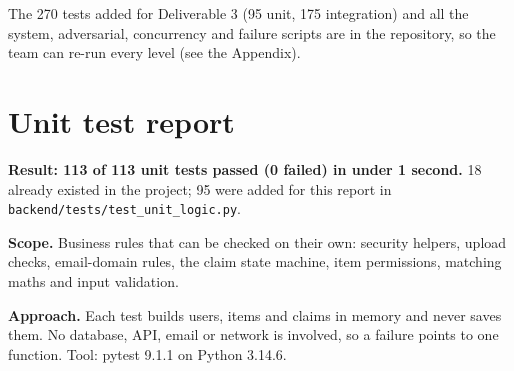 The 270 tests added for Deliverable 3 (95 unit, 175 integration) and all the system, adversarial, concurrency and failure scripts are in the repository, so the team can re-run every level (see the Appendix).

\section{Unit test report}

\textbf{Result: 113 of 113 unit tests passed (0 failed) in under 1 second.} 18 already existed in the project; 95 were added for this report in \texttt{backend/\allowbreak{}tests/\allowbreak{}test\_\allowbreak{}unit\_\allowbreak{}logic.\allowbreak{}py}.

\textbf{Scope.} Business rules that can be checked on their own: security helpers, upload checks, email-domain rules, the claim state machine, item permissions, matching maths and input validation.

\textbf{Approach.} Each test builds users, items and claims in memory and never saves them. No database, API, email or network is involved, so a failure points to one function. Tool: pytest 9.1.1 on Python 3.14.6.

